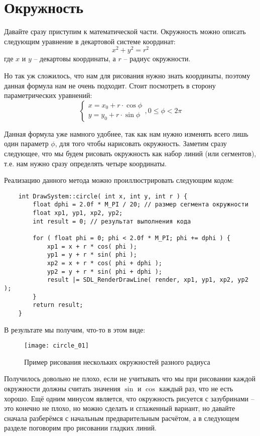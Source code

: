 \section{Окружность}
Давайте сразу приступим к математической части. Окружность можно описать следующим уравнение в декартовой 
системе координат:
\[
    x^2 + y^2 = r^2
\]
где \( x \) и \( y \) -- декартовы координаты, а \( r \) -- радиус окружности.

Но так уж сложилось, что нам для рисования нужно знать координаты, поэтому данная формула нам не очень 
подходит. Стоит посмотреть в сторону параметрических уравнений:
\[
    \left\{ \begin{array}{l}
        x = x_0 + r \cdot \cos\phi \\
        y = y_0 + r \cdot \sin\phi 
    \end{array} \right., 0 \leq \phi < 2\pi
\]

Данная формула уже намного удобнее, так как нам нужно изменять всего лишь один параметр \( \phi \), для того 
чтобы нарисовать окружность. Заметим сразу следующее, что мы будем рисовать окружность как набор линий 
(или сегментов), т.е. нам нужно сразу определять четыре координаты. 

Реализацию данного метода можно проиллюстрировать следующим кодом:
\begin{lstlisting}
    int DrawSystem::circle( int x, int y, int r ) {
        float dphi = 2.0f * M_PI / 20; // размер сегмента окружности
        float xp1, yp1, xp2, yp2;
        int result = 0; // результат выполнения кода

        for ( float phi = 0; phi < 2.0f * M_PI; phi += dphi ) {
            xp1 = x + r * cos( phi ); 
            yp1 = y + r * sin( phi );
            xp2 = x + r * cos( phi + dphi );
            yp2 = y + r * sin( phi + dphi );
            result |= SDL_RenderDrawLine( render, xp1, yp1, xp2, yp2 );
        } 
        return result;
    }
\end{lstlisting}

\pagebreak

В результате мы получим, что-то в этом виде:
\begin{figure}[ht!]
    \centering
    \texttt{[image: circle\_01]}
    \caption{Пример рисования нескольких окружностей разного радиуса}
    \label{img:circleExample}
\end{figure}

Получилось довольно не плохо, если не учитывать что мы при рисовании каждой окружности должны считать 
значения \( \sin \) и \( \cos \) каждый раз, что не есть хорошо. Ещё одним минусом является, что окружность 
рисуется с зазубринами -- это конечно не плохо, но можно сделать и сглаженный вариант, но давайте сначала 
разберёмся с начальным предварительным расчётом, а в следующем разделе поговорим про рисовании гладких линий.

